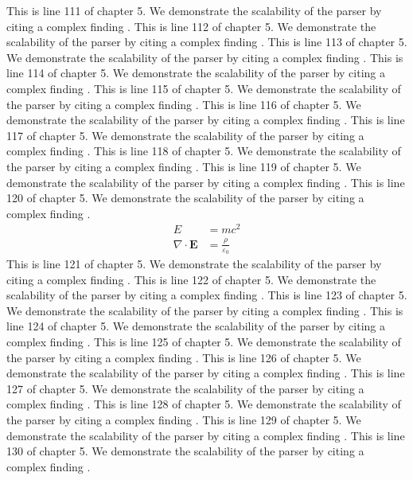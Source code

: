 This is line 111 of chapter 5. We demonstrate the scalability of the parser by citing a complex finding \cite{ref5_111}.
This is line 112 of chapter 5. We demonstrate the scalability of the parser by citing a complex finding \cite{ref5_112}.
This is line 113 of chapter 5. We demonstrate the scalability of the parser by citing a complex finding \cite{ref5_113}.
This is line 114 of chapter 5. We demonstrate the scalability of the parser by citing a complex finding \cite{ref5_114}.
This is line 115 of chapter 5. We demonstrate the scalability of the parser by citing a complex finding \cite{ref5_115}.
This is line 116 of chapter 5. We demonstrate the scalability of the parser by citing a complex finding \cite{ref5_116}.
This is line 117 of chapter 5. We demonstrate the scalability of the parser by citing a complex finding \cite{ref5_117}.
This is line 118 of chapter 5. We demonstrate the scalability of the parser by citing a complex finding \cite{ref5_118}.
This is line 119 of chapter 5. We demonstrate the scalability of the parser by citing a complex finding \cite{ref5_119}.
This is line 120 of chapter 5. We demonstrate the scalability of the parser by citing a complex finding \cite{ref5_120}.
\begin{align*}
  E &= mc^2 \\
  \nabla \cdot \mathbf{E} &= \frac{\rho}{\varepsilon_0}
\end{align*}
This is line 121 of chapter 5. We demonstrate the scalability of the parser by citing a complex finding \cite{ref5_121}.
This is line 122 of chapter 5. We demonstrate the scalability of the parser by citing a complex finding \cite{ref5_122}.
This is line 123 of chapter 5. We demonstrate the scalability of the parser by citing a complex finding \cite{ref5_123}.
This is line 124 of chapter 5. We demonstrate the scalability of the parser by citing a complex finding \cite{ref5_124}.
This is line 125 of chapter 5. We demonstrate the scalability of the parser by citing a complex finding \cite{ref5_125}.
This is line 126 of chapter 5. We demonstrate the scalability of the parser by citing a complex finding \cite{ref5_126}.
This is line 127 of chapter 5. We demonstrate the scalability of the parser by citing a complex finding \cite{ref5_127}.
This is line 128 of chapter 5. We demonstrate the scalability of the parser by citing a complex finding \cite{ref5_128}.
This is line 129 of chapter 5. We demonstrate the scalability of the parser by citing a complex finding \cite{ref5_129}.
This is line 130 of chapter 5. We demonstrate the scalability of the parser by citing a complex finding \cite{ref5_130}.
